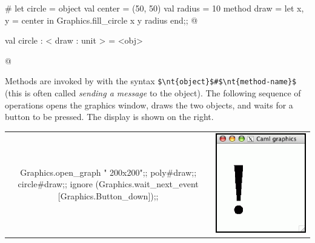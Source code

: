 \begin{ocaml}
# let circle =
  object
     val center = (50, 50)
     val radius = 10
     method draw =
        let x, y = center in
        Graphics.fill_circle x y radius
  end;;
@
\begin{topoutput}
val circle : < draw : unit > = <obj>
\end{topoutput}
@
\end{ocaml}
%
Methods are invoked by with the syntax \hbox{\lstinline/$\nt{object}$#$\nt{method-name}$/} (this is
often called \emph{sending a message} to the object).  The following sequence of operations opens the
graphics window, draws the two objects, and waits for a button to be pressed.  The display is shown on the
right.

\begin{center}
\begin{tabular}{cc}
\begin{minipage}[b]{3.5in}
\begin{ocamllisting}
Graphics.open_graph " 200x200";;
poly#draw;;
circle#draw;;
ignore (Graphics.wait_next_event [Graphics.Button_down]);;
\end{ocamllisting}
\end{minipage}
&
\includegraphics[scale=0.3]{graphics1}
\end{tabular}
\end{center}
